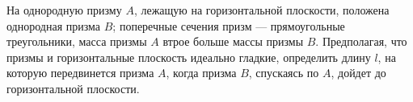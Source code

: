 На однородную призму $A$, лежащую на горизонтальной плоскости, положена
однородная призма $B$; поперечные сечения призм --- прямоугольные 
треугольники, масса призмы $A$ втрое больше массы призмы $B$. Предполагая,
что призмы и горизонтальные плоскость идеально гладкие, определить длину 
$l$, на которую передвинется призма $A$, когда призма $B$, спускаясь
по $A$, дойдет до горизонтальной плоскости.

